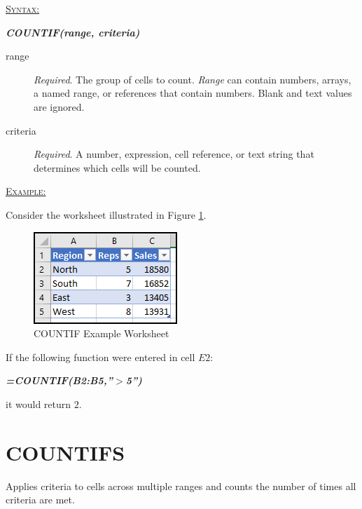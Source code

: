 \begin{addmargin}[1cm]{0cm}

	\medskip
	\underline{\textsc{Syntax:}}
	\medskip

	{\color{Syntax}
		\noindent\textbf{\textit{COUNTIF(range, criteria)}}
	}
	
	\begin{description}
		\item[range] \textit{Required}. The group of cells to count. \textit{Range} can contain numbers, arrays, a named range, or references that contain numbers. Blank and text values are ignored.
		\item[criteria] \textit{Required}. A number, expression, cell reference, or text string that determines which cells will be counted.
	\end{description}

	\medskip
	\noindent\underline{\textsc{Example:}}
	\medskip
	
	\noindent Consider the worksheet illustrated in Figure \ref{apa:cif}.

	\begin{figure}[H]
		\centering
		\includegraphics[width=\maxwidth{.45\linewidth}]{gfx/apa_fig01}
		\caption{COUNTIF Example Worksheet}
		\label{apa:cif}
	\end{figure}
	
	\noindent If the following function were entered in cell $ E2 $:
	
	{\color{Syntax}
		\textit{\textbf{=COUNTIF(B2:B5,''$ > $5'')}}
	}

	\noindent it would return $ 2 $.

\end{addmargin}

\section{COUNTIFS}

Applies criteria to cells across multiple ranges and counts the number of times all criteria are met.

